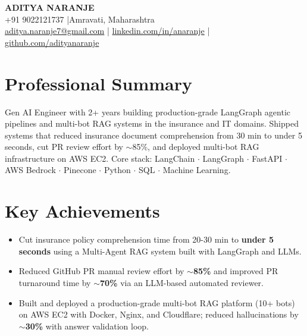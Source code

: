 \documentclass[10pt, letterpaper]{article}
\newcommand{\resumeItem}[1]{%
  \item\small{#1}
}
\begin{document}
\pagestyle{empty}

\begin{center}
  {\Huge \textbf{ADITYA NARANJE}} \\[4pt]
  \small
  +91 9022121737 \quad|\quad Amravati, Maharashtra \\[2pt]
  \href{mailto:aditya.naranje7@gmail.com}{aditya.naranje7@gmail.com} \quad|\quad
  \href{https://linkedin.com/in/anaranje}{linkedin.com/in/anaranje} \quad|\quad
  \href{https://github.com/adityanaranje}{github.com/adityanaranje}
\end{center}

\vspace{-4pt}

\section{Professional Summary}

Gen AI Engineer with 2+ years building production-grade LangGraph agentic pipelines and multi-bot RAG systems in the insurance and IT domains. Shipped systems that reduced insurance document comprehension from 30 min to under 5 seconds, cut PR review effort by $\sim$85\%, and deployed multi-bot RAG infrastructure on AWS EC2. Core stack: LangChain $\cdot$ LangGraph $\cdot$ FastAPI $\cdot$ AWS Bedrock $\cdot$ Pinecone $\cdot$ Python $\cdot$ SQL $\cdot$ Machine Learning.

\vspace{-2pt}

\section{Key Achievements}

\begin{itemize}
  \resumeItem{Cut insurance policy comprehension time from 20-30 min to \textbf{under 5 seconds} using a Multi-Agent RAG system built with LangGraph and LLMs.}
  \resumeItem{Reduced GitHub PR manual review effort by \textbf{$\sim$85\%} and improved PR turnaround time by \textbf{$\sim$70\%} via an LLM-based automated reviewer.}
  \resumeItem{Built and deployed a production-grade multi-bot RAG platform (10+ bots) on AWS EC2 with Docker, Nginx, and Cloudflare; reduced hallucinations by \textbf{$\sim$30\%} with answer validation loop.}
\end{itemize}
\end{document}
